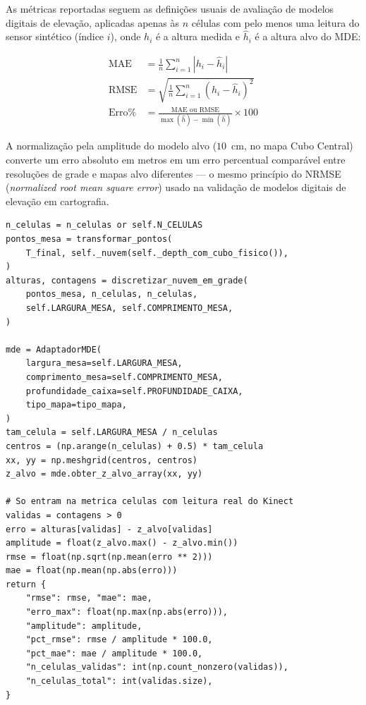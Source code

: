 As métricas reportadas seguem as definições usuais de avaliação de
modelos digitais de elevação, aplicadas apenas às $n$ células com pelo
menos uma leitura do sensor sintético (índice $i$), onde $h_i$ é a
altura medida e $\hat h_i$ é a altura alvo do MDE:

\begin{align}
\text{MAE} &= \frac{1}{n}\sum_{i=1}^{n} \left| h_i - \hat h_i \right| \\
\text{RMSE} &= \sqrt{\frac{1}{n}\sum_{i=1}^{n} \left( h_i - \hat h_i \right)^2} \\
\text{Erro\%} &= \frac{\text{MAE ou RMSE}}{\max(\hat h) - \min(\hat h)} \times 100
\end{align}

\noindent A normalização pela amplitude do modelo alvo ($10$~cm, no
mapa Cubo Central) converte um erro absoluto em metros em um erro
percentual comparável entre resoluções de grade e mapas alvo
diferentes — o mesmo princípio do NRMSE (\textit{normalized root mean
square error}) usado na validação de modelos digitais de elevação em
cartografia.

\begin{lstlisting}[caption={Núcleo de \texttt{\_erro\_mde}, o método comum usado pela medição de referência, pelos controles negativos e pela varredura de resolução — extraído literalmente de \texttt{test\_motor\_caixao.py} (linhas 1946--1983).}, label=lst:erro-quantitativo]
n_celulas = n_celulas or self.N_CELULAS
pontos_mesa = transformar_pontos(
    T_final, self._nuvem(self._depth_com_cubo_fisico()),
)
alturas, contagens = discretizar_nuvem_em_grade(
    pontos_mesa, n_celulas, n_celulas,
    self.LARGURA_MESA, self.COMPRIMENTO_MESA,
)

mde = AdaptadorMDE(
    largura_mesa=self.LARGURA_MESA,
    comprimento_mesa=self.COMPRIMENTO_MESA,
    profundidade_caixa=self.PROFUNDIDADE_CAIXA,
    tipo_mapa=tipo_mapa,
)
tam_celula = self.LARGURA_MESA / n_celulas
centros = (np.arange(n_celulas) + 0.5) * tam_celula
xx, yy = np.meshgrid(centros, centros)
z_alvo = mde.obter_z_alvo_array(xx, yy)

# So entram na metrica celulas com leitura real do Kinect
validas = contagens > 0
erro = alturas[validas] - z_alvo[validas]
amplitude = float(z_alvo.max() - z_alvo.min())
rmse = float(np.sqrt(np.mean(erro ** 2)))
mae = float(np.mean(np.abs(erro)))
return {
    "rmse": rmse, "mae": mae,
    "erro_max": float(np.max(np.abs(erro))),
    "amplitude": amplitude,
    "pct_rmse": rmse / amplitude * 100.0,
    "pct_mae": mae / amplitude * 100.0,
    "n_celulas_validas": int(np.count_nonzero(validas)),
    "n_celulas_total": int(validas.size),
}
\end{lstlisting}

